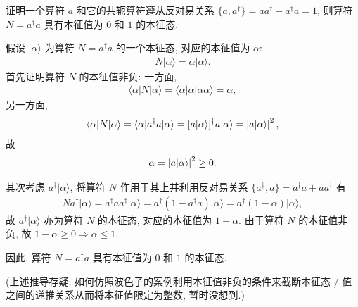 \documentclass{assignment}
\begin{document}
\begin{prob}[课本习题 7.7]
    证明一个算符 $a$ 和它的共轭算符遵从反对易关系 $\{a,a^{\dagger}\}=aa^{\dagger}+a^{\dagger}a=1$, 则算符 $N=a^{\dagger}a$ 具有本征值为 $0$ 和 $1$ 的本征态.
\end{prob}
\begin{pf}
    假设 $\lvert\alpha\rangle$ 为算符 $N=a^{\dagger}a$ 的一个本征态, 对应的本征值为 $\alpha$:
    \begin{align}
        N\lvert\alpha\rangle=\alpha\lvert\alpha\rangle.
    \end{align}
    首先证明算符 $N$ 的本征值非负: 一方面,
    \begin{align}
        \langle\alpha\rvert N\lvert\alpha\rangle=\langle\alpha\rvert\alpha\lvert\alpha\alpha\rangle=\alpha,
    \end{align}
    另一方面,
    \begin{align}
        \langle\alpha\rvert N\lvert\alpha\rangle=\langle\alpha\rvert a^{\dagger}a\lvert\alpha\rangle=[a\lvert\alpha\rangle]^{\dagger}a\lvert\alpha\rangle=\left\lvert a\lvert\alpha\rangle\right\rvert^2,
    \end{align}
    故
    \begin{align}
        \alpha=\left\lvert a\lvert\alpha\rangle\right\rvert^2\geq 0.
    \end{align}

    其次考虑 $a^{\dagger}\lvert\alpha\rangle$, 将算符 $N$ 作用于其上并利用反对易关系 $\{a^{\dagger},a\}=a^{\dagger}a+aa^{\dagger}$ 有
    \begin{align}
        Na^{\dagger}\lvert\alpha\rangle=a^{\dagger}aa^{\dagger}\lvert\alpha\rangle=a^{\dagger}(1-a^{\dagger}a)\lvert\alpha\rangle=a^{\dagger}(1-\alpha)\lvert\alpha\rangle,
    \end{align}
    故 $a^{\dagger}\lvert\alpha\rangle$ 亦为算符 $N$ 的本征态, 对应的本征值为 $1-\alpha$. 由于算符 $N$ 的本征值非负, 故 $1-\alpha\geq 0\Longrightarrow\alpha\leq 1$.

    因此, 算符 $N=a^{\dagger}a$ 具有本征值为 $0$ 和 $1$ 的本征态.

    (上述推导存疑: 如何仿照波色子的案例利用本征值非负的条件来截断本征态 / 值之间的递推关系从而将本征值限定为整数, 暂时没想到.)
\end{pf}
\end{document}
